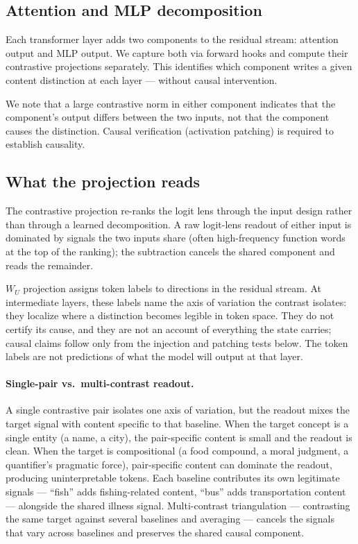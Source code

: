 \documentclass[11pt]{article}
\newcommand{\WU}{W_U}
\begin{document}
\subsection{Attention and MLP decomposition}

Each transformer layer adds two components to the residual stream: attention
output and MLP output. We capture both via forward hooks and compute their
contrastive projections separately. This identifies which component writes a
given content distinction at each layer --- without causal intervention.

We note that a large contrastive norm in either component indicates that the
component's output differs between the two inputs, not that the component causes
the distinction. Causal verification (activation patching) is required to
establish causality.

\subsection{What the projection reads}

The contrastive projection re-ranks the logit lens through the input
design rather than through a learned decomposition. A raw logit-lens
readout of either input is dominated by signals the two inputs share
(often high-frequency function words at the top of the ranking); the
subtraction cancels the shared component and reads the remainder.

$\WU$ projection assigns token labels to directions in the residual
stream. At intermediate layers, these labels name the axis of variation
the contrast isolates: they localize where a distinction becomes legible
in token space. They do not certify its cause, and they are not an
account of everything the state carries; causal claims follow only from
the injection and patching tests below. The token labels are not
predictions of what the model will output at that layer.

\paragraph{Single-pair vs.\ multi-contrast readout.} A single contrastive pair
isolates one axis of variation, but the readout mixes the target signal
with content specific to that baseline. When the target concept
is a single entity (a name, a city), the pair-specific content is small
and the readout is clean. When the target is compositional (a food compound,
a moral judgment, a quantifier's pragmatic force), pair-specific content
can dominate the readout, producing
uninterpretable tokens. Each baseline contributes its own legitimate
signals --- ``fish'' adds fishing-related content, ``bus'' adds transportation
content --- alongside the shared illness signal. Multi-contrast
triangulation --- contrasting the same target against several baselines and
averaging --- cancels the signals that vary across baselines and preserves
the shared causal component.
\end{document}
